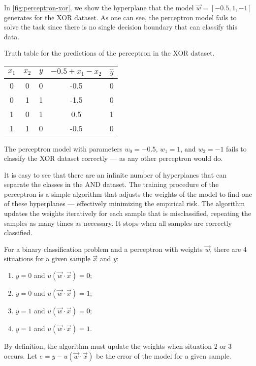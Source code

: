 In \cref{fig:perceptron-xor}, we show the hyperplane that the model $\vec{w} = [-0.5, 1, -1]$
generates for the XOR dataset.  As one can see, the perceptron model fails to solve the
task since there is no single decision boundary that can classify this data.

\begin{tablebox}[label=tab:xor-perceptron]{Truth table for the predictions of the perceptron in the XOR dataset.}
  \centering
  \begin{tabular}{ccc|cc}
    \toprule
    $x_1$ & $x_2$ & $y$ & $-0.5 + x_1 - x_2$ & $\hat{y}$ \\
    \midrule
    0 & 0 & 0 & -0.5 & 0 \\
    0 & 1 & 1 & -1.5 & 0 \\
    1 & 0 & 1 & 0.5 & 1 \\
    1 & 1 & 0 & -0.5 & 0 \\
    \bottomrule
  \end{tabular}
  \tcblower
  The perceptron model with parameters $w_0 = -0.5$, $w_1 = 1$, and $w_2 = -1$
  fails to classify the XOR dataset correctly --- as any other perceptron would do.
\end{tablebox}

It is easy to see that there are an infinite number of hyperplanes that can separate the
classes in the AND dataset.  The training procedure of the perceptron is a simple
algorithm that adjusts the weights of the model to find one of these hyperplanes ---
effectively minimizing the empirical risk.  The algorithm updates the weights iteratively
for each sample that is misclassified, repeating the samples as many times as necessary.
It stops when all samples are correctly classified.

For a binary classification problem and a perceptron with weights $\vec{w}$, there are 4
situations for a given sample $\vec{x}$ and $y$:
\begin{enumerate}
  \itemsep0em
  \item $y = 0$ and $u(\vec{w} \cdot \vec{x})= 0$;
  \item $y = 0$ and $u(\vec{w} \cdot \vec{x})= 1$;
  \item $y = 1$ and $u(\vec{w} \cdot \vec{x})= 0$;
  \item $y = 1$ and $u(\vec{w} \cdot \vec{x})= 1$.
\end{enumerate}

By definition, the algorithm must update the weights when situation 2 or 3 occurs.
Let $e = y - u(\vec{w} \cdot \vec{x})$ be the error of the model for a given sample.

